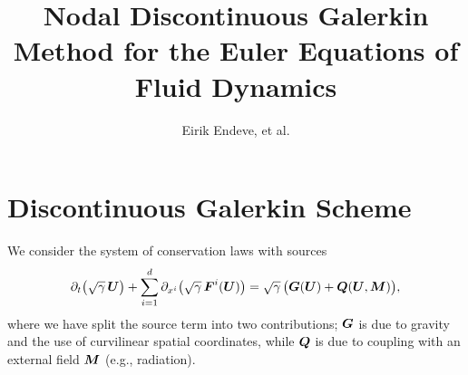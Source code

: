 \documentclass[10pt,preprint]{aastex}
\begin{document}
\title{Nodal Discontinuous Galerkin Method for the Euler Equations of Fluid Dynamics}
\author{Eirik Endeve, et al.}


\tableofcontents

\section{Discontinuous Galerkin Scheme}
\label{sec:dgMethod}

We consider the system of conservation laws with sources
\begin{equation}
  \partial_{t}{}\big(\sqrt{\gamma}\,\boldsymbol{U}\big)+\sum_{i=1}^{d}\partial_{x^{i}}{}\big(\sqrt{\gamma}\,\boldsymbol{F}^{i}(\boldsymbol{U})\big)=\sqrt{\gamma}\,\big(\boldsymbol{G}(\boldsymbol{U})+\boldsymbol{Q}(\boldsymbol{U},\boldsymbol{M})\big),
  \label{eq:conservationLaws}
\end{equation}
where we have split the source term into two contributions; $\boldsymbol{G}$ is due to gravity and the use of curvilinear spatial coordinates, while $\boldsymbol{Q}$ is due to coupling with an external field $\boldsymbol{M}$ (e.g., radiation).  
\end{document}
